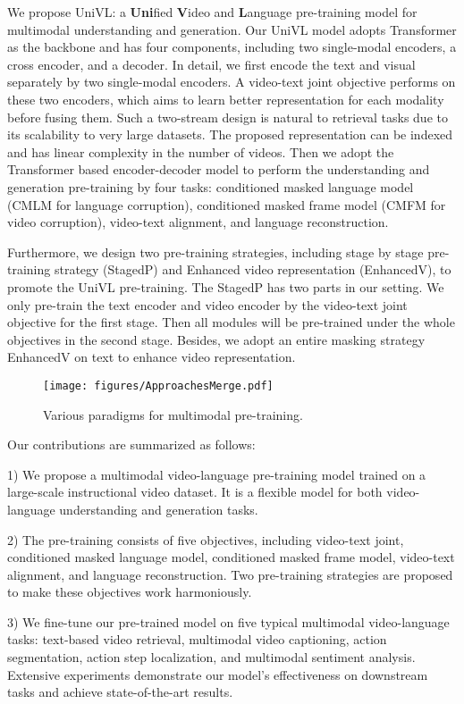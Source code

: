 \documentclass[11pt,a4paper]{article}
\begin{document}
	We propose UniVL: a \textbf{Uni}fied \textbf{V}ideo and \textbf{L}anguage pre-training model for multimodal understanding and generation. Our UniVL model adopts Transformer \cite{vaswani2017attention} as the backbone and has four components, including two single-modal encoders, a cross encoder, and a decoder. In detail, we first encode the text and visual separately by two single-modal encoders. A video-text joint objective performs on these two encoders, which aims to learn better representation for each modality before fusing them. Such a two-stream design is natural to retrieval tasks due to its scalability to very large datasets. The proposed representation can be indexed and has linear complexity in the number of videos. Then we adopt the Transformer based encoder-decoder model to perform the understanding and generation pre-training by four tasks: conditioned masked language model (CMLM for language corruption), conditioned masked frame model (CMFM for video corruption), video-text alignment, and language reconstruction.

	Furthermore, we design two pre-training strategies, including stage by stage pre-training strategy (StagedP) and Enhanced video representation (EnhancedV), to promote the UniVL pre-training. The StagedP has two parts in our setting. We only pre-train the text encoder and video encoder by the video-text joint objective for the first stage. Then all modules will be pre-trained under the whole objectives in the second stage. Besides, we adopt an entire masking strategy EnhancedV on text to enhance video representation.
	\begin{figure*}[tp]
		\centering
		\texttt{[image: figures/ApproachesMerge.pdf]}
		\caption{Various paradigms for multimodal pre-training.}
		\label{fig:paradigms}
	\end{figure*}
	
	Our contributions are summarized as follows:

	1) We propose a multimodal video-language pre-training model trained on a large-scale instructional video dataset. It is a flexible model for both video-language understanding and generation tasks. 

	2) The pre-training consists of five objectives, including video-text joint, conditioned masked language model, conditioned masked frame model, video-text alignment, and language reconstruction. Two pre-training strategies are proposed to make these objectives work harmoniously.

	3) We fine-tune our pre-trained model on five typical multimodal video-language tasks: text-based video retrieval, multimodal video captioning, action segmentation, action step localization, and multimodal sentiment analysis. Extensive experiments demonstrate our model's effectiveness on downstream tasks and achieve state-of-the-art results.
	
\end{document}
